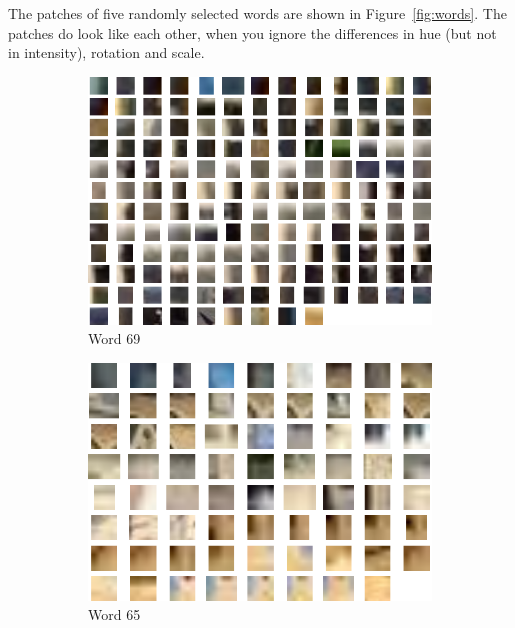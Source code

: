 \documentclass[a4paper,10pt,twoside]{article}
\begin{document}
The patches of five randomly selected words are shown in Figure~\ref{fig:words}.  The patches do look like each other, when you ignore the differences in hue (but not in intensity), rotation and scale.

\begin{figure}
  \begin{subfigure}{0.49\textwidth}
    \centering
    \includegraphics[width=\textwidth,height=.3\textheight,keepaspectratio]{word1}
    \caption{Word 69}
  \end{subfigure}
  \begin{subfigure}{0.49\textwidth}
    \centering
    \includegraphics[width=\textwidth,height=.3\textheight,keepaspectratio]{word2}
    \caption{Word 65}
  \end{subfigure}
  \begin{subfigure}{0.49\textwidth}

\end{subfigure}
\end{figure}
\end{document}
